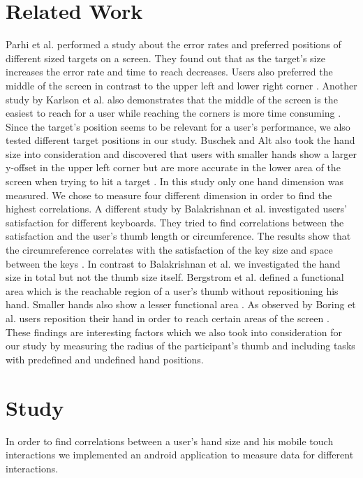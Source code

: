 \documentclass{sigchi}
\begin{document}
\section{Related Work}
Parhi et al. performed a study about the error rates and preferred positions of different sized targets on a screen. They found out that as the target's size increases the error rate and time to reach decreases. Users also preferred the middle of the screen in contrast to the upper left and lower right corner \cite{parhi2006target}. Another study by Karlson et al. also demonstrates that the middle of the screen is the easiest to reach for a user while reaching the corners is more time consuming \cite{karlson2006studies}. Since the target's position seems to be relevant for a user's performance, we also tested different target positions in our study. Buschek and Alt also took the hand size into consideration and discovered that users with smaller hands show a larger y-offset in the upper left corner but are more accurate in the lower area of the screen when trying to hit a target \cite{buschek2015touchml}. In this study only one hand dimension was measured. We chose to measure four different dimension in order to find the highest correlations. A different study by Balakrishnan et al. investigated users' satisfaction for different keyboards. They tried to find correlations between the satisfaction and the user's thumb length or circumference. The results show that the circumreference correlates with the satisfaction of the key size and space between the keys \cite{balakrishnan2008study}. In contrast to Balakrishnan et al. we investigated the hand size in total but not the thumb size itself. Bergstrom et al. defined a functional area which is the reachable region of a user's thumb without repositioning his hand. Smaller hands also show a lesser functional area \cite{bergstrom2014modeling}. As observed by Boring et al. users reposition their hand in order to reach certain areas of the screen \cite{boring2012fat}. These findings are interesting factors which we also took into consideration for our study by measuring the radius of the participant's thumb and including tasks with predefined and undefined hand positions.

\section{Study}
In order to find correlations between a user's hand size and his mobile touch interactions we implemented an android application to measure data for different interactions. 
\end{document}
